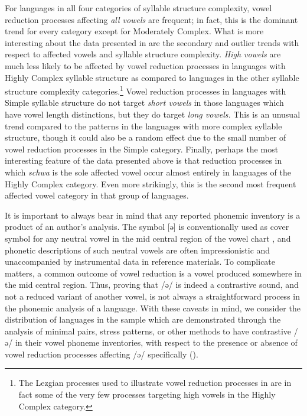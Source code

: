   For languages in all four categories of syllable structure complexity, vowel reduction processes affecting \textit{all vowels} are frequent; in fact, this is the dominant trend for every category except for Moderately Complex. What is more interesting about the data presented in  are the secondary and outlier trends with respect to affected vowels and syllable structure complexity. \textit{High vowels} are much less likely to be affected by vowel reduction processes in languages with Highly Complex syllable structure as compared to languages in the other syllable structure complexity categories.\footnote{{The Lezgian processes used to illustrate vowel reduction processes in  are in fact some of the very few processes targeting high vowels in the Highly Complex category.}} Vowel reduction processes in languages with Simple syllable structure do not target \textit{short vowels} in those languages which have vowel length distinctions, but they do target \textit{long vowels.} This is an unusual trend compared to the patterns in the languages with more complex syllable structure, though it could also be a random effect due to the small number of vowel reduction processes in the Simple category. Finally, perhaps the most interesting feature of the data presented above is that reduction processes in which \textit{schwa} is the sole affected vowel occur almost entirely in languages of the Highly Complex category. Even more strikingly, this is the second most frequent affected vowel category in that group of languages.

  It is important to always bear in mind that any reported phonemic inventory is a product of an author’s analysis. The symbol [ə] is conventionally used as cover symbol for any neutral vowel in the mid central region of the vowel chart \citep[280]{Laver1994}, and phonetic descriptions of such neutral vowels are often impressionistic and unaccompanied by instrumental data in reference materials. To complicate matters, a common outcome of vowel reduction is a vowel produced somewhere in the mid central region. Thus, proving that /ə/ is indeed a contrastive sound, and not a reduced variant of another vowel, is not always a straightforward process in the phonemic analysis of a language. With these caveats in mind, we consider the distribution of languages in the sample which are demonstrated through the analysis of minimal pairs, stress patterns, or other methods to have contrastive /ə/ in their vowel phoneme inventories, with respect to the presence or absence of vowel reduction processes affecting /ə/ specifically ().

